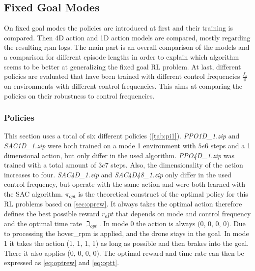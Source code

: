 \subsection{Fixed Goal Modes}
On fixed goal modes the policies are introduced at first and their training is compared. 
Then 4D action and 1D action models are compared, mostly regarding the resulting rpm logs. 
The main part is an overall comparison of the models and a comparison for different episode lengths in order 
to explain which algorithm seems to be better at generalizing the fixed goal RL problem. 
At last, different policies are evaluated that have been trained with different control frequencies $\frac{f_s}{\aleph}$ on environments with different control frequencies. 
This aims at comparing the policies on their robustness to control frequencies.

\subsubsection{Policies}
This section uses a total of six different policies (\cref{tab:pi1}).
\emph{PPO1D\_1.zip} and \\ \emph{SAC1D\_1.zip} were both trained on a mode 1 environment with $5e6$ steps and a 1 dimensional action, 
but only differ in the used algorithm.
 \emph{PPO4D\_1.zip} was trained with a total amount of $3e7$ steps. Also, the dimensionality of the action increases to four.
 \emph{SAC4D\_1.zip} and \emph{SAC4D48\_1.zip} only differ in the used control frequency, but operate with the same action and were both learned with the SAC algorithm.
 \emph{$\pi_{opt}$} is the theoretical construct of the optimal policy for this RL problems based on \cref{sec:oprew}. 
 It always takes the optimal action therefore defines the best possible reward $r_opt$ that depends on mode and control frequency and the optimal time rate $\beth_{opt}$.
 In mode 0 the action is always (0, 0, 0, 0). 
 Due to processing the hover\_rpm is applied, and the drone stays in the goal. 
 In mode 1 it takes the action (1, 1, 1, 1) as long as possible and then brakes into the goal. 
 There it also applies (0, 0, 0, 0). The optimal reward and time rate can then be expressed as \cref{eq:optrew} and \cref{eq:optt}.
 
